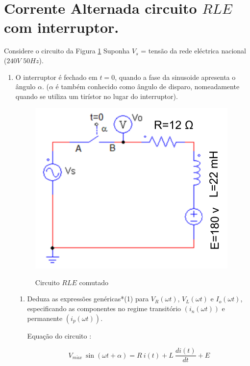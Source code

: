 \documentclass[titlepage, a4paper, 11pt, reqno, openany]{report}
\begin{document}
\section{Corrente Alternada circuito $RLE$ com interruptor.}
%
\begin{flushleft}
Considere o circuito da Figura \ref{grafico 1} Suponha $V_s$ = tens\~{a}o da rede el\'{e}ctrica nacional ($240V\,\, 50Hz$).\par
\end{flushleft}
%
\begin{enumerate}
\item
O interruptor \'{e} fechado em $t=0$, quando a fase da sinusoide apresenta o \^{a}ngulo $\alpha$. ($\alpha$ \'{e} tamb\'{e}m conhecido como \^{a}ngulo de disparo, nomeadamente quando se utiliza um tir\'{i}stor no lugar do interruptor).\par
%
\begin{figure}[H]
\centering
\includegraphics[scale=0.75]{./image/Screenshot21.png}\\
\caption{Circuito $RLE$ comutado}
\label{grafico 1}
\end{figure}\par
%
\begin{enumerate}
\item 
Deduza as express\~{o}es gen\'{e}ricas*(1) para $V_R(\omega t)$, $V_L(\omega t)$ e $I_o(\omega t)$, especificando as componentes no regime transit\'{o}rio $(i_n(\omega t))$ e permanente $(i_p(\omega t))$.\par Equa\c{c}\~{a}o do circuito :\par
\begin{equation}
\boxed{ V_{m\acute{a}x}\ \sin(\omega t + \alpha)=R\ i(t)+L\ \frac{d i(t)}{dt}+E }

\end{equation}
\end{enumerate}
\end{enumerate}
\end{document}
